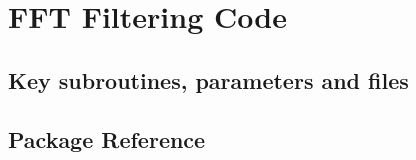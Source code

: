 \section{FFT Filtering Code}
\label{sec:zonal_filt}
\subsection{Key subroutines, parameters and files}
\label{sec:pkg:zonal_filt:implementation_synopsis}
\subsection{Package Reference}
